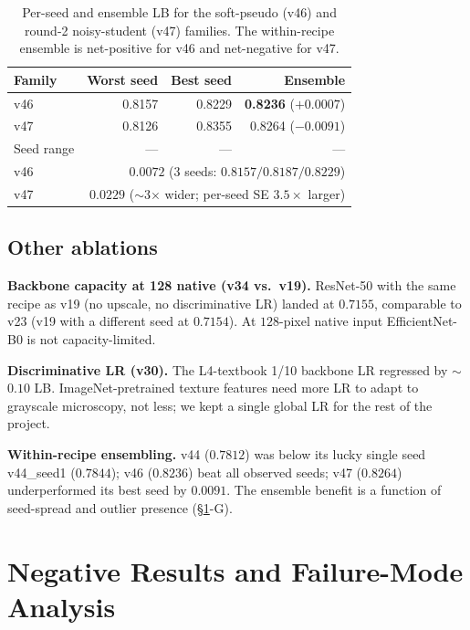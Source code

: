 \documentclass[conference]{IEEEtran}
\begin{document}
\begin{table}[!t]
  \centering
  \caption{Per-seed and ensemble LB for the soft-pseudo (v46) and round-2 noisy-student (v47) families. The within-recipe ensemble is net-positive for v46 and net-negative for v47.}
  \label{tab:seedspread}
  \footnotesize
  \begin{tabular}{@{}lrrr@{}}
    \toprule
    Family & Worst seed & Best seed & Ensemble \\
    \midrule
    v46 & 0.8157 & 0.8229 & \textbf{0.8236} ($+0.0007$) \\
    v47 & 0.8126 & 0.8355 & 0.8264 ($-0.0091$) \\
    \midrule
    Seed range & --- & --- & --- \\
    v46 & \multicolumn{3}{r}{$0.0072$ \quad (3 seeds: $0.8157 / 0.8187 / 0.8229$)} \\
    v47 & \multicolumn{3}{r}{$0.0229$ \quad ($\sim$3$\times$ wider; per-seed SE $3.5\times$ larger)} \\
    \bottomrule
  \end{tabular}
\end{table}

\subsection{Other ablations}

\textbf{Backbone capacity at 128 native (v34 vs.\ v19).} ResNet-50 with the same recipe as v19 (no upscale, no discriminative LR) landed at $0.7155$, comparable to v23 (v19 with a different seed at $0.7154$). At $128$-pixel native input EfficientNet-B0 is not capacity-limited.

\textbf{Discriminative LR (v30).} The L4-textbook 1/10 backbone LR regressed by $\sim$$0.10$ LB. ImageNet-pretrained texture features need more LR to adapt to grayscale microscopy, not less; we kept a single global LR for the rest of the project.

\textbf{Within-recipe ensembling.} v44 ($0.7812$) was below its lucky single seed v44\_seed1 ($0.7844$); v46 ($0.8236$) beat all observed seeds; v47 ($0.8264$) underperformed its best seed by $0.0091$. The ensemble benefit is a function of seed-spread and outlier presence (\S\ref{sec:negative}-G).

\section{Negative Results and Failure-Mode Analysis}
\label{sec:negative}
\end{document}
